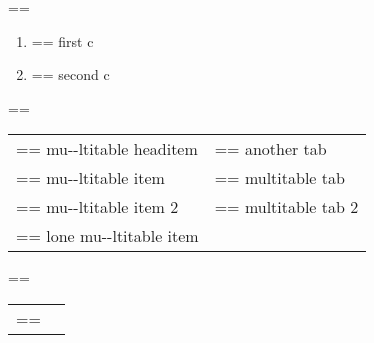 \documentclass{book}
\makeatletter
\newenvironment{GNUTexinfopreformatted}{%
  \par\GNUTobeylines\obeyspaces\frenchspacing
  \parskip=\z@\parindent=\z@}{}
{\catcode`\^^M=13 \gdef\GNUTobeylines{\catcode`\^^M=13 \def^^M{\null\par}}}
\newenvironment{GNUTexinfoindented}
  {\begin{list}{}{}
  \item\relax}
  {\end{list}}
\makeatother
\begin{document}
\begin{GNUTexinfoindented}
\begin{GNUTexinfopreformatted}
\ttfamily 
\end{GNUTexinfopreformatted}
\begin{enumerate}[label=\alph*.,start=3]
\item \begin{GNUTexinfopreformatted}%
\ttfamily first c
\end{GNUTexinfopreformatted}
\item \begin{GNUTexinfopreformatted}%
\ttfamily second c
\end{GNUTexinfopreformatted}
\end{enumerate}
\begin{GNUTexinfopreformatted}%
\ttfamily 
\end{GNUTexinfopreformatted}
\begin{tabular}{m{} m{}}%
\begin{GNUTexinfopreformatted}%
\ttfamily mu{-}{-}ltitable headitem \end{GNUTexinfopreformatted}&
\begin{GNUTexinfopreformatted}%
\ttfamily another tab
\end{GNUTexinfopreformatted}\\
\begin{GNUTexinfopreformatted}%
\ttfamily mu{-}{-}ltitable item \end{GNUTexinfopreformatted}&
\begin{GNUTexinfopreformatted}%
\ttfamily multitable tab
\end{GNUTexinfopreformatted}\\
\begin{GNUTexinfopreformatted}%
\ttfamily mu{-}{-}ltitable item 2 \end{GNUTexinfopreformatted}&
\begin{GNUTexinfopreformatted}%
\ttfamily multitable tab 2
\index[cp]{index entry within multitable}%
\end{GNUTexinfopreformatted}\\
\begin{GNUTexinfopreformatted}%
\ttfamily lone mu{-}{-}ltitable item
\end{GNUTexinfopreformatted}&\\
\end{tabular}%
\begin{GNUTexinfopreformatted}%
\ttfamily 
\end{GNUTexinfopreformatted}
\begin{tabular}{m{} m{}}%
\begin{GNUTexinfopreformatted}%

\end{GNUTexinfopreformatted}
\end{tabular}
\end{GNUTexinfoindented}
\end{document}
